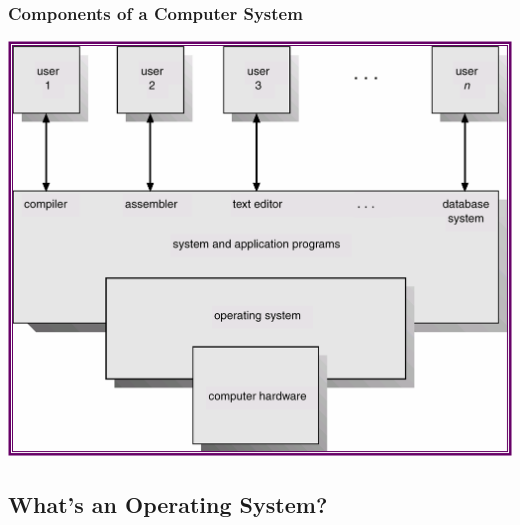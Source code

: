 \documentclass[CJKutf8,xcolor=pdftex,dvipsnames,table]{beamer}
\begin{document}
\begin{CJK*}{UTF8}{song}
  \begin{frame}
    \frametitle{Components of a Computer System} \pause
	  \begin{center}
	    \includegraphics[scale=0.5]{v6f1-1}
	  \end{center}
  \end{frame}

  \subsection{What's an Operating System?}


\end{CJK*}
\end{document}
